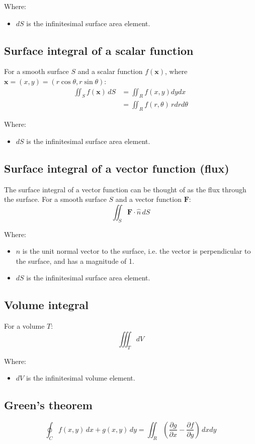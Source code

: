 \documentclass[11pt]{article}
\begin{document}
Where:
\begin{itemize}
\item \(dS\) is the infinitesimal surface area element.
\end{itemize}
\subsection{Surface integral of a scalar function}
\label{sec:org64824d3}
For a smooth surface \(S\) and a scalar function \(f(\boldsymbol{x})\), where \(\boldsymbol{x} = (x, y) = (r \cos \theta, r \sin \theta)\):
\begin{align*}
\iint_S f(\boldsymbol{x}) \, dS &= \iint_R f(x, y) dy dx \\
&= \iint_R f(r, \theta) \, r dr d \theta
\end{align*}

Where:
\begin{itemize}
\item \(dS\) is the infinitesimal surface area element.
\end{itemize}
\subsection{Surface integral of a vector function (flux)}
\label{sec:org3fecaf3}
The surface integral of a vector function can be thought of as the flux through the surface.
For a smooth surface \(S\) and a vector function \(\boldsymbol{F}\):
\[\iint_S \boldsymbol{F} \cdot \hat{n} \, dS\]

Where:
\begin{itemize}
\item \(\hat{n}\) is the unit normal vector to the surface, i.e. the vector is perpendicular to the surface, and has a magnitude of 1.
\item \(dS\) is the infinitesimal surface area element.
\end{itemize}
\subsection{Volume integral}
\label{sec:orgec6427f}
For a volume \(T\):
\[\iiint_T dV\]

Where:
\begin{itemize}
\item \(dV\) is the infinitesimal volume element.
\end{itemize}

 \newpage
\subsection{Green's theorem}
\label{sec:org8f0cb00}
\[\oint_C f(x, y) \, dx + g (x, y) \, dy = \iint_R \left(\frac{\partial g}{\partial x} - \frac{\partial f}{\partial y} \right) \, dx dy\]
\end{document}
